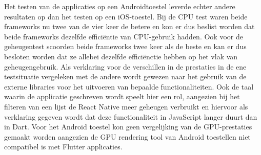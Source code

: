 Het testen van de applicaties op een Androidtoestel leverde echter andere resultaten op dan het testen op een iOS-toestel. Bij de CPU test waren beide frameworks nu twee van de vier keer de betere en kon er dus beslist worden dat beide frameworks dezelfde efficiëntie van CPU-gebruik hadden. Ook voor de geheugentest scoorden beide frameworks twee keer als de beste en kan er dus besloten worden dat ze allebei dezelfde efficiënctie hebben op het vlak van geheugengebruik. Als verklaring voor de verschillen in de prestaties in de ene testsituatie vergeleken met de andere wordt gewezen naar het gebruik van de externe libraries voor het uitvoeren van bepaalde functionaliteiten. Ook de taal waarin de applicatie geschreven wordt speelt hier een rol, aangezien bij het filteren van een lijst de React Native meer geheugen verbruikt en hiervoor als verklaring gegeven wordt dat deze functionaliteit in JavaScript langer duurt dan in Dart. Voor het Android toestel kon geen vergelijking van de GPU-prestaties gemaakt worden aangezien de GPU rendering tool van Android toestellen niet compatibel is met Flutter applicaties.


